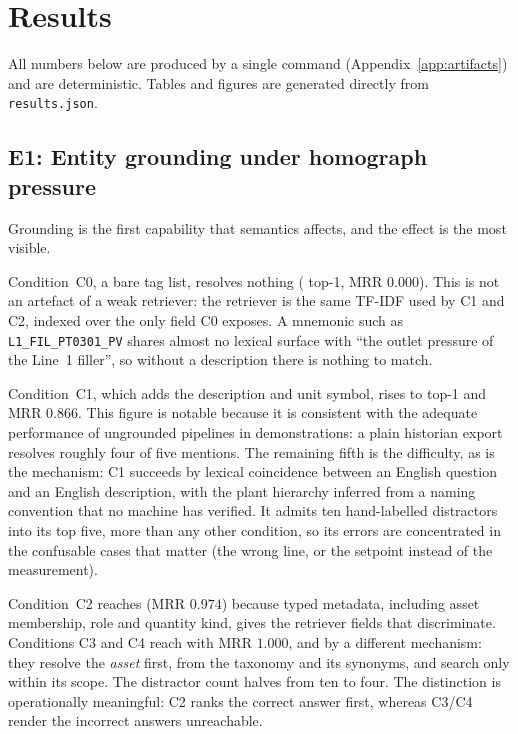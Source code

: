 \section{Results}
\label{sec:results}

All numbers below are produced by a single command
(Appendix~\ref{app:artifacts}) and are deterministic. Tables and figures are
generated directly from \texttt{results.json}.

\subsection{E1: Entity grounding under homograph pressure}



Grounding is the first capability that semantics affects, and the effect is the
most visible.

Condition~C0, a bare tag list, resolves nothing
(\GrndTopOneCZero{} top-1, MRR $0.000$). This is not an artefact of a weak
retriever: the retriever is the same TF-IDF used by C1 and C2, indexed over the
only field C0 exposes. A mnemonic such as \texttt{L1\_FIL\_PT0301\_PV} shares
almost no lexical surface with ``the outlet pressure of the Line~1 filler'', so
without a description there is nothing to match.

Condition~C1, which adds the description and unit symbol, rises to
\GrndTopOneCOne{} top-1 and MRR $0.866$. This figure is notable because it is
consistent with the adequate performance of ungrounded pipelines in
demonstrations: a plain historian export resolves roughly four of five mentions.
The remaining fifth is the difficulty, as is the mechanism: C1 succeeds by lexical
coincidence between an English question and an English description, with the plant
hierarchy inferred from a naming convention that no machine has verified. It
admits ten hand-labelled distractors into its top five, more than any other
condition, so its errors are concentrated in the confusable cases that matter (the
wrong line, or the setpoint instead of the measurement).

Condition~C2 reaches \GrndTopOneCTwo{} (MRR $0.974$) because typed metadata,
including asset membership, role and quantity kind, gives the retriever fields that
discriminate. Conditions C3 and C4 reach \GrndTopOneCFour{} with MRR $1.000$,
and by a different mechanism: they resolve the \emph{asset} first, from the
taxonomy and its synonyms, and search only within its scope. The distractor count
halves from ten to four. The distinction is operationally meaningful: C2 ranks the
correct answer first, whereas C3/C4 render the incorrect answers unreachable.

